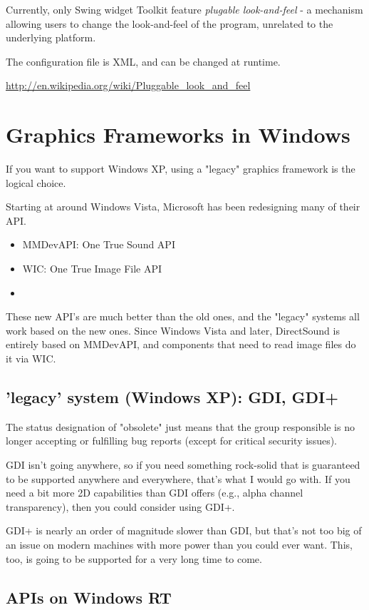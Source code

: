 Currently, only Swing widget Toolkit feature {\it plugable look-and-feel} - a
mechanism allowing users to change the look-and-feel of the program,
unrelated to the underlying platform.

The configuration file is XML, and can be changed at runtime.

\url{http://en.wikipedia.org/wiki/Pluggable_look_and_feel}


\section{Graphics Frameworks in Windows}

If you want to support Windows XP, using a "legacy" graphics framework is the
logical choice.

Starting at around Windows Vista, Microsoft has been
redesigning many of their API.
\begin{itemize}
  \item MMDevAPI: One True Sound API
  \item WIC: One True Image File API
  \item 
\end{itemize}
These new API's are much better than the old ones, and the "legacy" systems all
work based on the new ones.
Since Windows Vista and later, DirectSound is entirely based on MMDevAPI, and
components that need to read image files do it via WIC.

\subsection{'legacy' system (Windows XP): GDI, GDI+}
\label{sec:GDI}
\label{sec:GDI+}

The status designation of "obsolete" just means that the group responsible is no
longer accepting or fulfilling bug reports (except for critical security issues).

GDI isn't going anywhere, so if you need something rock-solid that is guaranteed
to be supported anywhere and everywhere, that's what I would go with.
If you need a bit more 2D capabilities than GDI offers (e.g., alpha channel
transparency), then you could consider using GDI+.

GDI+ is nearly an order of magnitude slower than GDI, but that's not too big of
an issue on modern machines with more power than you could ever want. This, too,
is going to be supported for a very long time to come.



\subsection{APIs on Windows RT}
\label{sec:GraphicsAPI_Windows-RT}

